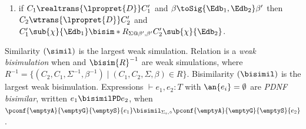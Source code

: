 \begin{definition}
\begin{enumerate}
    \item
      if $C_1 {\realtrans{\lpropret{D}}} C_1'$
      and
      $\beta{\toSig{\Edb_1,\Edb_2}}\beta'$
      then $C_2 {\wtrans{\lpropret{D}}} C_2'$
      and
      $C_1'\sub{\chi}{\Edb_1} \bisim*{R}_{\Sigma@\beta',\beta'} C_2'\sub{\chi}{\Edb_2}$.
    \end{enumerate}
  Similarity $(\simil)$ is the largest weak simulation.
  Relation  is a \emph{weak bisimulation} when  and $\bisim{R}^{-1}$ are weak simulations, where $R^{-1}=\{(C_2,C_1,\Sigma^{-1},\beta^{-1})\mid (C_1,C_2,\Sigma,\beta)\in R\}$.
  Bisimilarity $(\bisimil)$ is the largest weak bisimulation.
    Expressions $\vdash e_1,e_2: T$ %
  with {$\an{e_i}=\emptyset$}
are \emph{PDNF bisimilar}, written $e_1 \bisimilPD e_2$,
when 
  $\pconf{\emptyA}{\emptyG}{\emptyS}{e_1} \bisimil_{\Sigma_\diamond,\diamond}
  \pconf{\emptyA}{\emptyG}{\emptyS}{e_2}$.
\end{definition}


